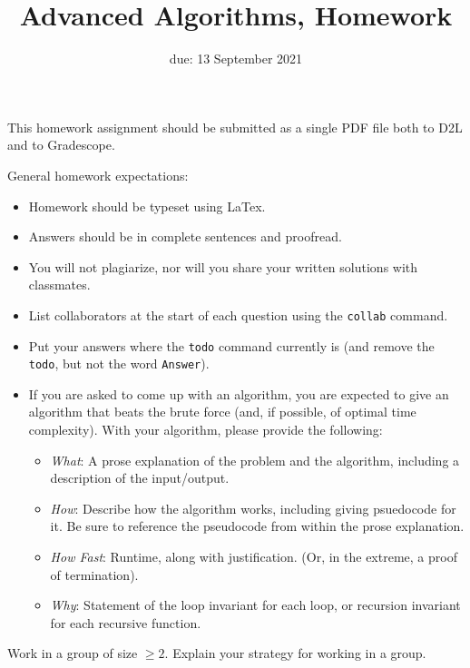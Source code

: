 \documentclass{article}
\title{Advanced Algorithms, Homework \hwnum}
\author{\todo{Your Name Here}}
\date{due: 13 September 2021}
\begin{document}
\maketitle

This homework assignment should be
submitted as a single PDF file both to D2L and to Gradescope.

General homework expectations:
\begin{itemize}
    \item Homework should be typeset using LaTex.
    \item Answers should be in complete sentences and proofread.
    \item You will not plagiarize, nor will you share your written solutions
        with classmates.
    \item List collaborators at the start of each question using the
        \texttt{collab} command.
    \item Put your answers where the \texttt{todo} command currently is (and
        remove the \texttt{todo}, but not the word \texttt{Answer}).
    \item If you are asked to come up with an algorithm, you are
        expected to give an algorithm that beats the brute force (and, if possible, of
        optimal time complexity). With your algorithm, please provide the following:
        \begin{itemize}
            \item \emph{What}: A prose explanation of the problem and the algorithm,
                including a description of the input/output.
            \item \emph{How}: Describe how the algorithm works, including giving
                psuedocode for it.  Be sure to reference the pseudocode
                from within the prose explanation.
            \item \emph{How Fast}: Runtime, along with justification.  (Or, in the
                extreme, a proof of termination).
            \item \emph{Why}: Statement of the loop invariant for each loop, or
                recursion invariant for each recursive function.
        \end{itemize}
\end{itemize}




Work in a group of size $\geq 2$.  Explain your strategy for working in a group.
\end{document}
